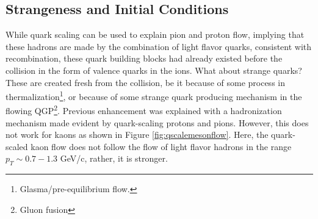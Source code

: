 \subsection{Strangeness and Initial Conditions}
While quark scaling can be used to explain pion and proton flow, implying that these hadrons are made by the combination of light flavor quarks, consistent with recombination, these quark building blocks had already existed before the collision in the form of valence quarks in the ions. What about strange quarks? These are created fresh from the collision, be it because of some process in thermalization\footnote{Glasma/pre-equilibrium flow.}, or because of some strange quark producing mechanism in the flowing QGP\footnote{Gluon fusion}. Previous enhancement was explained with a hadronization mechanism made evident by quark-scaling protons and pions. However, this does not work for kaons as shown in Figure \ref{fig:qscalemesonflow}. Here, the quark-scaled kaon flow does not follow the flow of light flavor hadrons in the range $p_T \sim 0.7-1.3$ GeV/c, rather, it is stronger.

